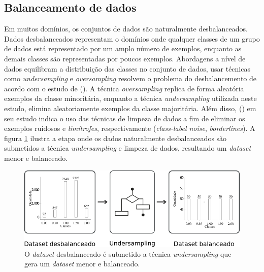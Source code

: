 \subsection{Balanceamento de dados}
\label{subsection:balanceamento_dados}

Em muitos domínios, os conjuntos de dados são naturalmente desbalanceados. 
Dados desbalanceados representam o domínios onde qualquer classes de um grupo 
de dados está representado por um amplo número de exemplos, enquanto as demais 
classes são representadas por poucos exemplos. Abordagens a nível de dados 
equilibram a distribuição das classes no conjunto de dados, usar técnicas como 
\textit{undersampling} e \textit{oversampling} resolvem o problema do 
desbalancemento de acordo com o estudo de  
(\citeyear{ferreiraestudo}). A técnica \textit{oversampling} replica de forma 
aleatória exemplos da classe minoritária, enquanto a técnica 
\textit{undersampling} utilizada neste estudo, elimina aleatoriamente exemplos 
da classe majoritária. Além disso,  
(\citeyear{machado2009estudo}) em seu estudo indica o uso das técnicas de 
limpeza de dados a fim de eliminar os exemplos ruidosos e \textit{limítrofes}, 
respectivamente (\textit{class-label noise}, \textit{borderlines}). A figura 
\ref{figure:metodologia_2} ilustra a etapa onde os dados naturalmente 
desbalanceados são submetidos a técnica \textit{undersampling} e limpeza de 
dados, resultando um \textit{dataset} menor e balanceado.

\begin{figure}[H]
\begin{center}
    \includegraphics[scale=0.70]{images/metodologia_2.png}
\end{center}
\caption{O \textit{dataset} desbalanceado é submetido a técnica
\textit{undersampling} que gera um \textit{dataset} menor e balanceado.}
\label{figure:metodologia_2}
\end{figure}



